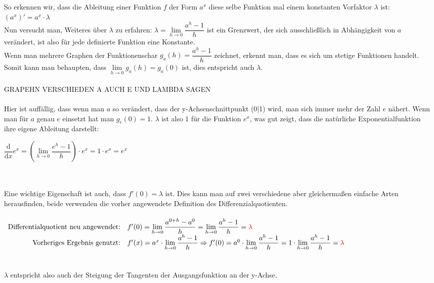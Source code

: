 So erkennen wir, dass die Ableitung einer Funktion $f$ der Form $a^x$ diese selbe Funktion mal einem konstanten Vorfaktor $\lambda$ ist: $(a^x)'=a^x\cdot\lambda$\\
Nun versucht man, Weiteres über $\lambda$ zu erfahren: $\lambda=\lim\limits_{h\to0}\dfrac{a^h-1}{h}$ ist ein Grenzwert, der sich ausschließlich in Abhängigkeit von $a$ verändert,  ist also für jede definierte Funktion eine Konstante.\\
Wenn man mehrere Graphen der Funktionenschar $g_a(h)=\dfrac{a^h-1}{h}$ zeichnet, erkennt man, dass es sich um stetige Funktionen handelt. Somit kann man behaupten, dass $\lim\limits_{h\to0}g_a(h)=g_a(0)$ ist, dies entspricht auch $\lambda$.\\\\
GRAPEHN VERSCHIEDEN A AUCH E UND LAMBDA SAGEN\\\\
Hier ist auffällig, dass wenn man $a$ so verändert, dass der y-Achsenschnittpunkt (0|1) wird, man sich immer mehr der Zahl $e$ nähert. Wenn man für $a$ genau $e$ einsetzt hat man $ g_e(0)=1$. $\lambda$ ist also $1$ für die Funktion $e^x$, was gut zeigt, dass die natürliche Exponentialfunktion ihre eigene Ableitung darstellt:
\begin{center}$\dfrac{\text{d}}{\text{d}x}e^x=(\lim\limits_{h\to0}\dfrac{e^h-1}{h})\cdot e^x=1\cdot e^x=e^x$\end{center}\\\\
Eine wichtige Eigenschaft ist auch, dass $f'(0)=\lambda$ ist. Dies kann man auf zwei verschiedene aber gleichermaßen einfache Arten herausfinden, beide verwenden die vorher angewendete Definition des Differenzialquotienten.\\\\
$\begin{array}{rl}
\text{Differentialquotient neu angewendet:}& f'(0)=\lim\limits_{h\to0}\dfrac{a^{0+h}-a^0}{h}=\lim\limits_{h\to0}\dfrac{a^h-1}{h}=\textcolor{red}{\lambda}\\
\text{Vorheriges Ergebnis genutzt:}&f'(x)=a^x\cdot\lim\limits_{h\to0}\dfrac{a^h-1}{h}\Rightarrow f'(0)=a^0\cdot\lim\limits_{h\to0}\dfrac{a^h-1}{h}=1\cdot\lim\limits_{h\to0}\dfrac{a^h-1}{h}=\textcolor{red}{\lambda}
\end{array}$
\\\\\\
$\lambda$ entspricht also auch der Steigung der Tangenten der Ausgangsfunktion an der y-Achse. 


